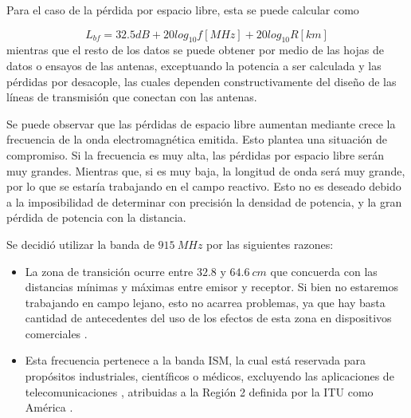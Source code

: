 Para el caso de la pérdida por espacio libre, esta se puede calcular como

\begin{equation}
L_{bf} = 32.5dB + 20log_{10}f[MHz]+20log_{10}R[km]
\end{equation}
\label{eq:perdidas_potencias}
mientras que el resto de los datos se puede obtener por medio de las hojas de datos o ensayos de las antenas, exceptuando la potencia a ser calculada y las pérdidas por desacople, las cuales dependen constructivamente del diseño de las líneas de transmisión que conectan con las antenas.


Se puede observar que las pérdidas de espacio libre aumentan mediante crece la frecuencia de la onda electromagnética emitida. Esto plantea una situación de compromiso. Si la frecuencia es muy alta, las pérdidas por espacio libre serán muy grandes. Mientras que, si es muy baja, la longitud de onda será muy grande, por lo que se estaría trabajando en el campo reactivo. Esto no es deseado debido a la imposibilidad de determinar con precisión la densidad de potencia, y la gran pérdida de potencia con la distancia.

Se decidió utilizar la banda de $915 \ MHz$ por las siguientes razones:
\begin{itemize}
\item La zona de transición ocurre entre $32.8$ y $64.6 \ cm$ que concuerda con las distancias mínimas y máximas entre emisor y receptor. Si bien no estaremos trabajando en campo lejano, esto no acarrea problemas, ya que hay basta cantidad de antecedentes del uso de los efectos de esta zona en dispositivos comerciales \cite{ref:NearFieldUHFRFID} \cite{ref:Humavox}.
\item Esta frecuencia pertenece a la banda ISM, la cual está reservada para propósitos industriales, científicos o médicos, excluyendo las aplicaciones de telecomunicaciones \cite{ref:ITUISM}, atribuidas a la Región 2 definida por la ITU como América \cite{ref:ITUREGION}.
\end{itemize}
 

